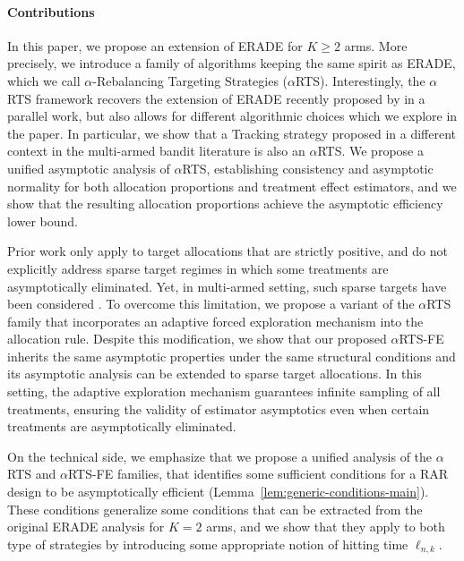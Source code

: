\paragraph*{Contributions} In this paper, we propose an extension of ERADE for $K\geq 2$ arms. More precisely, we introduce a family of algorithms keeping the same spirit as ERADE, which we call $\alpha$-Rebalancing Targeting Strategies ($\alpha$RTS). %
Interestingly, the $\alpha$RTS framework recovers the extension of ERADE recently proposed by \cite{alkhnefr2025efficient} in a parallel work, but also allows for different algorithmic choices which we explore in the paper. In particular, we show that a Tracking strategy proposed in a different context in the multi-armed bandit literature \citep{garivier2016optimal} is also an $\alpha$RTS. We propose a unified asymptotic analysis of $\alpha$RTS, establishing consistency and asymptotic normality for both allocation proportions and treatment effect estimators, and we show that the resulting allocation proportions achieve the asymptotic efficiency lower bound.

Prior work only apply to target allocations that are strictly positive, and do not explicitly address sparse target regimes in which some treatments are asymptotically eliminated. Yet, in multi-armed setting, such sparse targets have been considered \citep{tymofyeyev2007implementing}. To overcome this limitation, we propose a variant of the $\alpha$RTS family that incorporates an adaptive forced exploration mechanism into the allocation rule. Despite this modification, we show that our proposed $\alpha$RTS-FE inherits the same asymptotic properties  under the same structural conditions and its asymptotic analysis can be extended to sparse target allocations. In this setting, the adaptive exploration mechanism guarantees infinite sampling of all treatments, ensuring the validity of estimator asymptotics even when certain treatments are asymptotically eliminated.

On the technical side, we emphasize that we propose a unified analysis of the $\alpha$RTS and $\alpha$RTS-FE families, that identifies some sufficient conditions for a RAR design to be asymptotically efficient (Lemma~\ref{lem:generic-conditions-main}). These conditions generalize some conditions that can be  extracted from the original ERADE analysis for $K=2$ arms, and we show that they apply to both type of strategies by introducing some appropriate notion of hitting time $\ell_{n,k}$.

